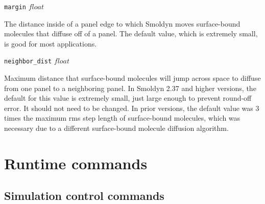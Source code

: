 \documentclass {scrbook}
\newcommand {\ttt} {\texttt}
\begin{document}
\begin{description}
\item{\ttt{margin} $float$}

The distance inside of a panel edge to which Smoldyn moves surface-bound molecules that diffuse off of a panel. The default value, which is extremely small, is good for most applications.

\item{\ttt{neighbor\_dist} $float$}

Maximum distance that surface-bound molecules will jump across space to diffuse from one panel to a neighboring panel. In Smoldyn 2.37 and higher versions, the default for this value is extremely small, just large enough to prevent round-off error. It should not need to be changed. In prior versions, the default value was 3 times the maximum rms step length of surface-bound molecules, which was necessary due to a different surface-bound molecule diffusion algorithm.

\end{description}



\chapter{Runtime commands}

\section{Simulation control commands}
\end{document}
